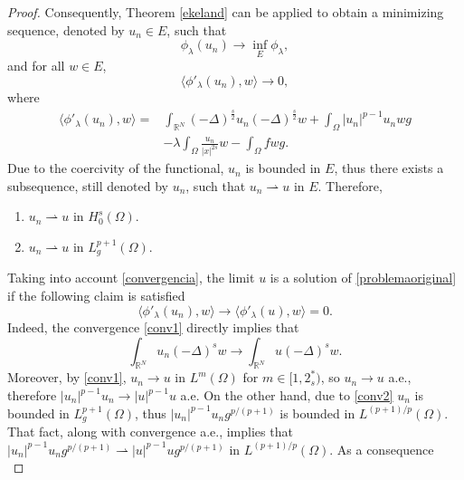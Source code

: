\documentclass[10pt,a4paper]{amsart}
\begin{document}
\begin{proof}
			
			Consequently, Theorem \ref{ekeland} can be applied to obtain a minimizing sequence, denoted by $u_n\in E$, such that 
			\[
			\phi_{\lambda}(u_n)\rightarrow \inf_{E}{\phi_{\lambda}},
			\]
			and for all $w\in E$, \begin{equation}\label{convergencia}
				\langle \phi'_{\lambda}(u_n),w\rangle\rightarrow 0,
			\end{equation}
			where 
			\begin{align*}
				\langle \phi'_{\lambda}(u_n),w\rangle=&\int_{\mathbb{R}^N}(-\Delta)^{\frac{s}{2}}u_n(-\Delta)^{\frac{s}{2}}w + \int_{\Omega}|u_n|^{p-1}u_nwg
				\\&-\lambda \int_{\Omega}\frac{u_n}{|x|^{2s}}w-\int_{\Omega}fwg.
			\end{align*}
			Due to the coercivity of the functional, $u_n$ is bounded in $E$, thus there exists a subsequence, still denoted by $u_n$, such that $u_n\rightharpoonup u$ in $E$. Therefore,
			\begingroup 
			\renewcommand{\theenumi}{(\alph{enumi})}
			\renewcommand{\labelenumi}{\theenumi}
			\begin{enumerate}
				\item $u_n\rightharpoonup u$ in $H^s_0(\Omega)$\label{conv1}.
				\item $u_n\rightharpoonup u$ in $L^{p+1}_g(\Omega)$\label{conv2}.
			\end{enumerate}
			\endgroup
			Taking into account \eqref{convergencia}, the limit $u$ is a solution of \eqref{problemaoriginal} if the following claim is satisfied
			\begin{equation}\label{limitsolution}
				\langle \phi'_{\lambda}(u_n),w\rangle\rightarrow \langle \phi'_{\lambda}(u),w\rangle= 0.
			\end{equation}
			Indeed, the convergence \ref{conv1} directly implies that 
			\begin{equation}\label{limitsolution1}
				\int_{\mathbb{R}^N}u_n(-\Delta)^{s}w\rightarrow \int_{\mathbb{R}^N}u(-\Delta)^{s}w.
			\end{equation}
			Moreover, by \ref{conv1}, $u_n\rightarrow u$ in $L^m(\Omega)$ for $m\in [1,2^*_s)$, so $u_n \rightarrow u$ a.e., therefore  $|u_n|^{p-1}u_n\rightarrow |u|^{p-1}u$ a.e.
			On the other hand, due to \ref{conv2} $u_n$ is bounded in $L^{p+1}_g(\Omega)$, thus $|u_n|^{p-1}u_n g^{p/(p+1)}$ is bounded in $ L^{(p+1)/p}(\Omega)$. That fact, along with convergence a.e., implies that $|u_n|^{p-1}u_n g^{p/(p+1)}\rightharpoonup |u|^{p-1}u g^{p/(p+1)}$ in $L^{(p+1)/p}(\Omega)$. As a consequence
			\begin{equation}\label{limitsolution2}

\end{equation}
\end{proof}
\end{document}
